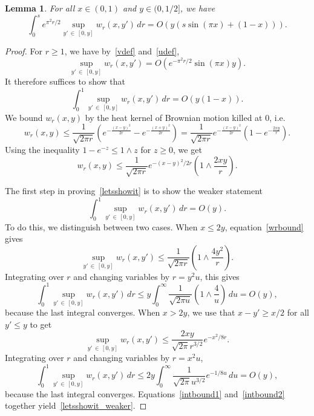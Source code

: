 \documentclass[10pt]{amsart}
\newtheorem{lemm}[theo]{Lemma}\newtheorem{prop}[theo]{Proposition}\newtheorem{coro}[theo]{Corollary}\newtheorem{conj}[theo]{Conjecture}
\theoremstyle{definition}\newtheorem{defi}[theo]{Definition}\newtheorem{rema}[theo]{Remark}\newtheorem{exam}[theo]{Example}\newtheorem{exem}[theo]{Example}\newtheorem{nota}[theo]{Notation}
\newcommand{\1} {\mathds{1}}
\begin{document}
\begin{lemm}\label{lem:wintunif}
For all $x \in (0,1)$ and $y \in (0, 1/2]$, we have
\[
\int_0^s e^{\pi^2 r/2}\sup_{y'\,\in\,[0,y]} w_r(x,y')\,dr = O(y(s\sin(\pi x)+(1-x))).
\]
\end{lemm}

\begin{proof}
For $r \ge 1$, we have by~\eqref{vdef} and~\eqref{udef},
\begin{equation}\label{wlarges}
\sup_{y'\,\in\,[0,y]} w_r(x,y') = O(e^{-\pi^2 r/2}\sin(\pi x)y).
\end{equation}
It therefore suffices to show that
\begin{equation}\label{letsshowit}
\int_0^1 \sup_{y'\,\in\,[0,y]} w_r(x,y')\,dr = O(y(1-x)).
\end{equation}
We bound $w_r(x,y)$ by the heat kernel of Brownian motion killed at $0$, i.e.
\[
w_r(x,y) \le \frac 1 {\sqrt{2\pi r}} \left(e^{-\frac{(x-y)^2}{2r}} - e^{-\frac{(x+y)^2}{2r}}\right) = \frac 1 {\sqrt{2\pi r}} e^{-\frac{(x-y)^2}{2r}}(1-e^{-\frac{2xy}r}).
\]
Using the inequality $1 - e^{-z} \leq 1 \wedge z$ for $z \geq 0$, we get
\begin{equation}\label{wrbound}
w_r(x,y) \leq \frac{1}{\sqrt{2 \pi r}} e^{-(x - y)^2/2r} \left(1 \wedge \frac{2 x y}{r} \right).
\end{equation}

The first step in proving~\eqref{letsshowit} is to show the weaker statement
\begin{equation}\label{letsshowit_weaker}
\int_0^1 \sup_{y'\,\in\,[0,y]} w_r(x,y')\,dr = O(y).
\end{equation}
To do this, we distinguish between two cases. When $x \leq 2y$, equation~\eqref{wrbound} gives
\[
\sup_{y'\,\in\,[0,y]}w_r(x,y') \le \frac 1 {\sqrt{2\pi r}} \left(1\wedge \frac {4y^2}{r}\right).
\]
Integrating over $r$ and changing variables by $r = y^2 u$, this gives
\begin{equation}\label{intbound1}
\int_0^1 \sup_{y'\,\in\,[0,y]} w_r(x,y')\,dr \le y \int_0^\infty \frac 1 {\sqrt{2\pi u}} \left(1\wedge \frac {4}{u}\right)\,du = O(y),
\end{equation}
because the last integral converges. When $x > 2y$, we use that $x-y' \ge x/2$ for all $y'\le y$ to get
\[
\sup_{y'\,\in\,[0,y]} w_r(x,y') \le \frac {2xy} {\sqrt{2\pi}r^{3/2}} e^{-x^2/8r}.
\]
Integrating over $r$ and changing variables by $r = x^2 u$,
\begin{equation}\label{intbound2}
\int_0^1 \sup_{y'\,\in\,[0,y]} w_r(x,y')\,dr \le 2 y \int_0^\infty \frac 1 {\sqrt{2\pi} u^{3/2}} e^{-1/8u}\,du = O(y),
\end{equation}
because the last integral converges. Equations~\eqref{intbound1} and~\eqref{intbound2} together yield~\eqref{letsshowit_weaker}.


\end{proof}
\end{document}
